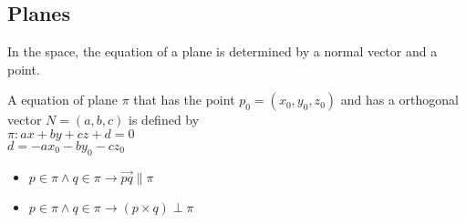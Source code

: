 

\subsection{Planes}
\label{sub_sec:sub_section_2}

\begin{definition}
  In the space, the equation of a plane is determined by a normal vector and a point.
\end{definition}

\begin{theorem}
  A equation of plane $\pi$ that has the point $p_{\scriptstyle{0}} = (x_{\scriptstyle{0}}, y_{\scriptstyle{0}}, z_{\scriptstyle{0}})$
  and has a orthogonal vector $N = (a, b, c)$ is defined by \\

  $\pi : ax + by + cz + d = 0$ \\

  $d = -ax_{\scriptstyle{0}} -by_{\scriptstyle{0}} -cz_{\scriptstyle{0}}$
\end{theorem}

\begin{note}
  \begin{itemize}
    \item $p \in \pi \land q \in \pi \rightarrow \vec{pq} \parallel \pi$
    \item $p \in \pi \land q \in \pi \rightarrow (p \times q) \perp \pi$
  \end{itemize}
\end{note}

